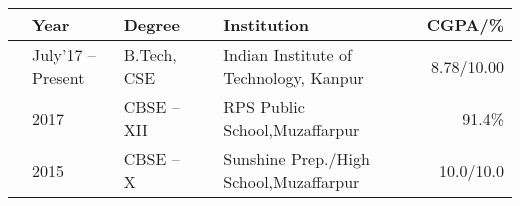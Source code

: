 
\newcommand{\education}[4]{
  & #1 & #2 & &#3 & #4
}
\begin{tabular}{ | L{0.05cm} l | L{3cm} | L{0.05cm} C{8cm} | r |}
  \hline
  \education{\textbf{Year}}{\textbf{Degree}}{\textbf{Institution}}{\textbf{CGPA/\%}}\\
  \hline
  \education{July'17 -- Present}{B.Tech, CSE}{Indian Institute of Technology, Kanpur}{8.78/10.00}\\
  \education{2017}{CBSE -- XII}{RPS Public School,Muzaffarpur}{91.4\%}\\
  \education{2015}{CBSE -- X}{Sunshine Prep./High School,Muzaffarpur}{10.0/10.0}\\
  \hline
\end{tabular}

